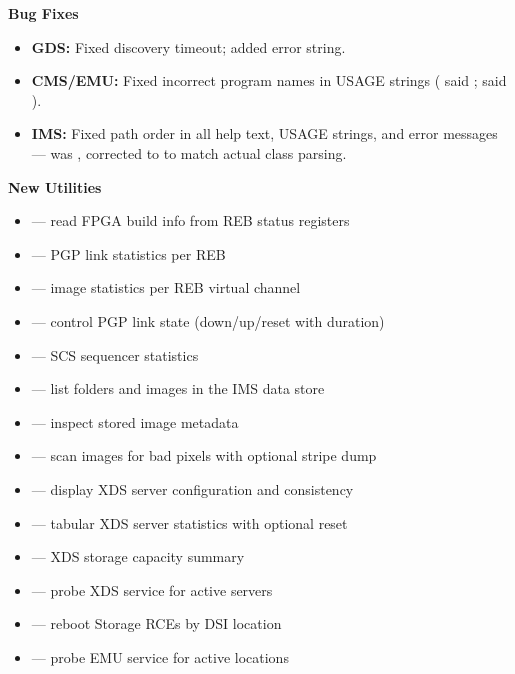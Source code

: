 \noindent\textbf{Bug Fixes}\par\nobreak
\begin{itemize}\compactlist
  \item \textbf{GDS:} Fixed  discovery timeout; added 
    error string.
  \item \textbf{CMS/EMU:} Fixed incorrect program names in USAGE strings
    ( said ;  said ).
  \item \textbf{IMS:} Fixed path order in all help text, USAGE strings, and error
    messages --- was , corrected to  to match
    actual  class parsing.
\end{itemize}

\noindent\textbf{New Utilities}\par\nobreak
\begin{itemize}\compactlist
  \item {} --- read FPGA build info from REB status registers
  \item {} --- PGP link statistics per REB
  \item {} --- image statistics per REB virtual channel
  \item {} --- control PGP link state (down/up/reset with duration)
  \item {} --- SCS sequencer statistics
  \item {} --- list folders and images in the IMS data store
  \item {} --- inspect stored image metadata
  \item {} --- scan images for bad pixels with optional stripe dump
  \item {} --- display XDS server configuration and consistency
  \item {} --- tabular XDS server statistics with optional reset
  \item {} --- XDS storage capacity summary
  \item {} --- probe XDS service for active servers
  \item {} --- reboot Storage RCEs by DSI location
  \item {} --- probe EMU service for active locations
\end{itemize}

